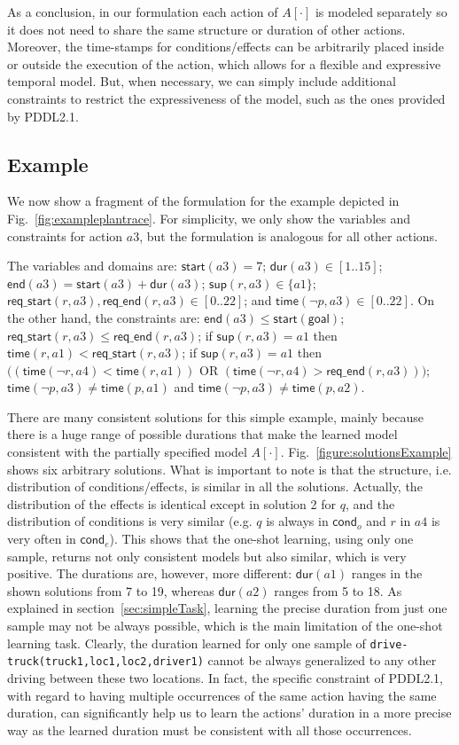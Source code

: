 \documentclass[runningheads]{llncs}
\newcommand{\cond}{\mathsf{cond}}  %
\newcommand{\dur}{\mathsf{dur}}    %
\newcommand{\start}{\mathsf{start}}%
\newcommand{\en}{\mathsf{end}}     %
\newcommand{\supp}{\mathsf{sup}}   %
\newcommand{\tim}{\mathsf{time}}   %
\newcommand{\reqs}{\mathsf{req\_{start}}} %
\newcommand{\reqe}{\mathsf{req\_{end}}}   %
\newcommand{\goal}{\mathsf{goal}}  %
\begin{document}
As a conclusion, in our formulation each action of $A[\cdot]$ is modeled separately so it does not need to share the same structure or duration of other actions. Moreover, the time-stamps for conditions/effects can be arbitrarily placed inside or outside the execution of the action, which allows for a flexible and expressive temporal model. But, when necessary, we can simply include additional constraints to restrict the expressiveness of the model, such as the ones provided by PDDL2.1.


\subsection{Example}
\label{sec:example}

We now show a fragment of the formulation for the example depicted in Fig.~\ref{fig:exampleplantrace}. For simplicity, we only show the variables and constraints for action $a3$, but the formulation is analogous for all other actions.

The variables and domains are: $\start(a3)=7$; $\dur(a3) \in [1..15]$; $\en(a3)=\start(a3)+\dur(a3)$; $\supp(r,a3) \in \{a1\}$; $\reqs(r,a3),\reqe(r,a3) \in [0..22]$; and $\tim(\neg p,a3) \in [0..22]$.
On the other hand, the constraints are: $\en(a3) \leq \start(\goal)$; $\reqs(r,a3) \leq \reqe(r,a3)$; if $\supp(r,a3)=a1$ then $\tim(r,a1) < \reqs(r,a3)$; if $\supp(r,a3)=a1$ then $((\tim(\neg r,a4) < \tim(r,a1))$ OR $(\tim(\neg r,a4) > \reqe(r,a3)))$; $\tim(\neg p,a3) \neq \tim(p,a1)$ and $\tim(\neg p,a3) \neq \tim(p,a2)$.

There are many consistent solutions for this simple example, mainly because there is a huge range of possible durations that make the learned model consistent with the partially specified model $A[\cdot]$.
Fig.~\ref{figure:solutionsExample} shows six arbitrary solutions. What is important to note is that the structure, i.e. distribution of conditions/effects, is similar in all the solutions. Actually, the distribution of the effects is identical except in solution 2 for $q$, and the distribution of conditions is very similar (e.g. $q$ is always in $\cond_o$ and $r$ in $a4$ is very often in $\cond_e$).
This shows that the one-shot learning, using only one sample, returns not only consistent models but also similar, which is very positive.
The durations are, however, more different: $\dur(a1)$ ranges in the shown solutions from 7 to 19, whereas $\dur(a2)$ ranges from 5 to 18. As explained in section~\ref{sec:simpleTask}, learning the precise duration from just one sample may not be always possible, which is the main limitation of the one-shot learning task.
Clearly, the duration learned for only one sample of \texttt{drive-truck(truck1,loc1,loc2,driver1)} cannot be always generalized to any other driving between these two locations.
In fact, the specific constraint of PDDL2.1, with regard to having multiple occurrences of the same action having the same duration, can significantly help us to learn the actions' duration in a more precise way as the learned duration must be consistent with all those occurrences.
\end{document}
